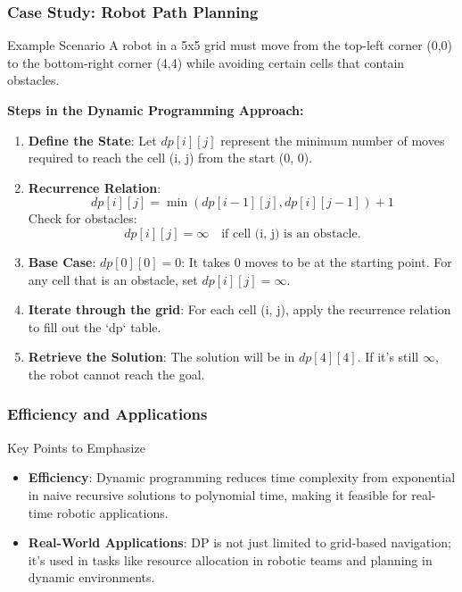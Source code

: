 \documentclass[aspectratio=169]{beamer}
\begin{document}
\begin{frame}[fragile]
  \frametitle{Case Study: Robot Path Planning}
  
  \begin{block}{Example Scenario}
    A robot in a 5x5 grid must move from the top-left corner (0,0) to the bottom-right corner (4,4) while avoiding certain cells that contain obstacles.
  \end{block}

  \textbf{Steps in the Dynamic Programming Approach:}
  \begin{enumerate}
    \item \textbf{Define the State}:
      Let \( dp[i][j] \) represent the minimum number of moves required to reach the cell (i, j) from the start (0, 0).
    
    \item \textbf{Recurrence Relation}:
      \begin{equation}
      dp[i][j] = \min(dp[i-1][j], dp[i][j-1]) + 1
      \end{equation}
      Check for obstacles:
      \begin{equation}
      dp[i][j] = \infty \quad \text{if cell (i, j) is an obstacle.}
      \end{equation}
    
    \item \textbf{Base Case}:
      \( dp[0][0] = 0 \): It takes 0 moves to be at the starting point.  
      For any cell that is an obstacle, set \( dp[i][j] = \infty \).
    
    \item \textbf{Iterate through the grid}: For each cell (i, j), apply the recurrence relation to fill out the `dp` table.
    
    \item \textbf{Retrieve the Solution}: The solution will be in \( dp[4][4] \). If it's still \( \infty \), the robot cannot reach the goal.
  \end{enumerate}
\end{frame}

\begin{frame}[fragile]
  \frametitle{Efficiency and Applications}
  
  \begin{block}{Key Points to Emphasize}
    \begin{itemize}
      \item \textbf{Efficiency}: Dynamic programming reduces time complexity from exponential in naive recursive solutions to polynomial time, making it feasible for real-time robotic applications.
      \item \textbf{Real-World Applications}: DP is not just limited to grid-based navigation; it's used in tasks like resource allocation in robotic teams and planning in dynamic environments.
    \end{itemize}
  \end{block}
\end{frame}
\end{document}
